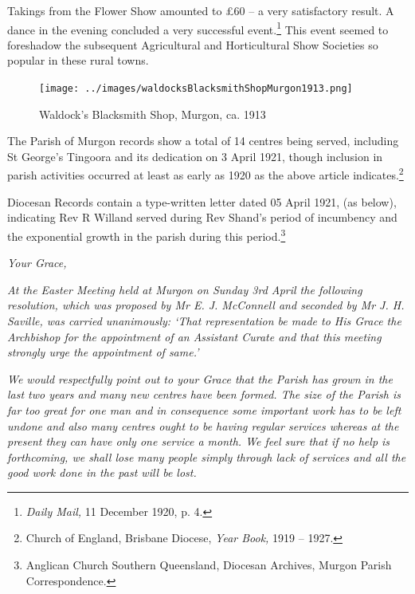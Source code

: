 Takings from the Flower Show amounted to \pounds60 -- a very satisfactory result. A dance in the evening concluded a very successful event.\footnote{\emph{Daily Mail,} 11 December 1920, p. 4.} This event seemed to foreshadow the subsequent Agricultural and Horticultural Show Societies so popular in these rural towns.








\begin{figure}
\begin{center}
\texttt{[image: ../images/waldocksBlacksmithShopMurgon1913.png]}
\caption{Waldock's Blacksmith Shop, Murgon, ca. 1913}
\end{center}
\end{figure}




The Parish of Murgon records show a total of 14 centres being served, including St George's Tingoora and its dedication on 3 April 1921, though inclusion in parish activities occurred at least as early as 1920 as the above article indicates.\footnote{Church of England, Brisbane Diocese, \emph{Year Book,} 1919 -- 1927.}


Diocesan Records contain a type-written letter dated 05 April 1921, (as below), indicating Rev R Willand served during Rev Shand's period of incumbency and the exponential growth in the parish during this period.\footnote{Anglican Church Southern Queensland, Diocesan Archives, Murgon Parish Correspondence.}


\medskip


\emph{Your Grace,}



\emph{At the Easter Meeting held at Murgon on Sunday 3rd April the following resolution, which was proposed by Mr E. J. McConnell and seconded by Mr J. H. Saville, was carried unanimously: `That representation be made to His Grace the Archbishop for the appointment of an Assistant Curate and that this meeting strongly urge the appointment of same.'}



\emph{We would respectfully point out to your Grace that the Parish has grown in the last two years and many new centres have been formed. The size of the Parish is far too great for one man and in consequence some important work has to be left undone and also many centres ought to be having regular services whereas at the present they can have only one service a month. We feel sure that if no help is forthcoming, we shall lose many people simply through lack of services and all the good work done in the past will be lost.}



